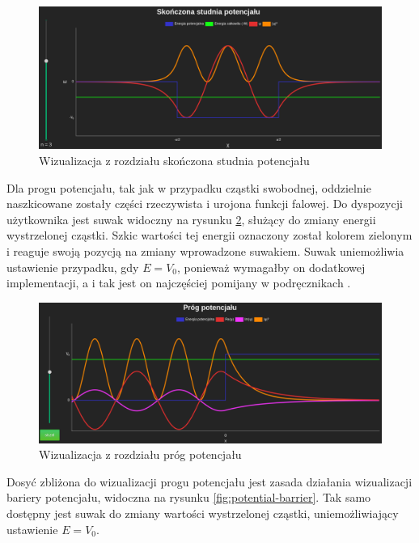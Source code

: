 \documentclass{SGGW-thesis}
\begin{document}
	\begin{figure}[H]
	\includegraphics[width=\textwidth,height=\textheight,keepaspectratio]{fiwell.png} 
	\caption{Wizualizacja z rozdziału skończona studnia potencjału}
	\label{fig:fi-well}
	\end{figure}
	
	Dla progu potencjału, tak jak w przypadku cząstki swobodnej, oddzielnie naszkicowane zostały części rzeczywista i urojona funkcji falowej. Do dyspozycji użytkownika jest suwak widoczny na rysunku \ref{fig:potential-jump}, służący do zmiany energii wystrzelonej cząstki. Szkic wartości tej energii oznaczony został kolorem zielonym i reaguje swoją pozycją na zmiany wprowadzone suwakiem. Suwak uniemożliwia ustawienie przypadku, gdy $E=V_0$, ponieważ wymagałby on dodatkowej implementacji, a i tak jest on najczęściej pomijany w podręcznikach \cite{fiz atom} \cite{mechanika kwant} \cite{fiz kwant}.
	
	\begin{figure}[H]
	\includegraphics[width=\textwidth,height=\textheight,keepaspectratio]{jump.png} 
	\caption{Wizualizacja z rozdziału próg potencjału}
	\label{fig:potential-jump}
	\end{figure}
	
	Dosyć zbliżona do wizualizacji progu potencjału jest zasada działania wizualizacji bariery potencjału, widoczna na rysunku \ref{fig:potential-barrier}. Tak samo dostępny jest suwak do zmiany wartości wystrzelonej cząstki, uniemożliwiający ustawienie $E=V_0$.
	
\end{document}
